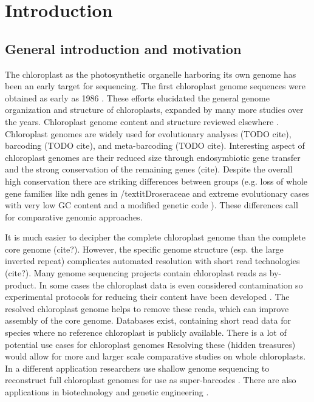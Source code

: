 \documentclass{bmcart}
\begin{document}

\section*{Introduction}
\subsection*{General introduction and motivation}
The chloroplast as the photosynthetic organelle harboring its own genome has been an early target for sequencing.
The first chloroplast genome sequences were obtained as early as 1986 \cite{ohyama_chloroplast_1986,shinozaki_complete_1986}.
These efforts elucidated the general genome organization and structure of chloroplasts, expanded by many more studies over the years.
Chloroplast genome content and structure reviewed elsewhere \cite{wicke_evolution_2011,green_chloroplast_2011}.
Chloroplast genomes are widely used for evolutionary analyses (TODO cite), barcoding (TODO cite), and meta-barcoding (TODO cite).
Interesting aspect of chloroplast genomes are their reduced size through endosymbiotic gene transfer \cite{martin_evolutionary_2002,timmis_endosymbiotic_2004} and the strong conservation of the remaining genes (cite).
Despite the overall high conservation there are striking differences between groups (e.g. loss of whole gene families like ndh genes in /textit{Droseraceae} \cite{nevill_plastome-wide_2019} and extreme evolutionary cases with very low GC content and a modified genetic code \cite{su_novel_2019}).
These differences call for comparative genomic approaches.

It is much easier to decipher the complete chloroplast genome than the complete core genome (cite?).
However, the specific genome structure (esp. the large inverted repeat) complicates automated resolution with short read technologies (cite?).
Many genome sequencing projects contain chloroplast reads as by-product.
In some cases the chloroplast data is even considered contamination so experimental protocols for reducing their content have been developed \cite{lutz_isolation_2011}.
The resolved chloroplast genome helps to remove these reads, which can improve assembly of the core genome.
Databases exist, containing short read data for species where no reference chloroplast is publicly available.
There is a lot of potential use cases for chloroplast genomes \cite{tonti-filippini_what_2017}
Resolving these (hidden treasures) would allow for more and larger scale comparative studies on whole chloroplasts.
In a different application researchers use shallow genome sequencing to reconstruct full chloroplast genomes for use as super-barcodes \cite{coissac_barcodes_2016}.
There are also applications in biotechnology and genetic engineering \cite{daniell_chloroplast_2016}.
\end{document}
